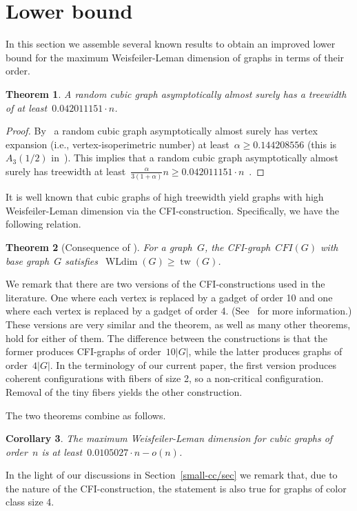 \documentclass[english,a4paper]{article}
\theoremstyle{plain}
\newtheorem{theorem}             {Theorem}[section]
\newtheorem{corollary}  [theorem]{Corollary}
\theoremstyle{definition}
\DeclareMathOperator*{\WLdim}{WLdim}
\newcommand{\wldim}[1]{\ensuremath{\WLdim\left(#1\right)}}
\DeclareMathOperator{\treewidth}{tw}
\begin{document}
\section{Lower bound}
\label{sec:lower:bound}


In this section we assemble several known results to obtain an improved lower bound for the maximum Weisfeiler-Leman dimension of graphs in terms of their order.


\begin{theorem}
    A random cubic graph asymptotically almost surely has a treewidth of at least~$ 0.042011151 \cdot n$.
\end{theorem}
\begin{proof}
    By~\cite{DBLP:journals/siamdm/KolesnikW14} a random cubic graph asymptotically almost surely has vertex expansion (i.e., vertex-isoperimetric number) at least~$\alpha\geq 0.144208556$ (this is~$A_3(1/2)$ in~\cite{DBLP:journals/siamdm/KolesnikW14}).
    This implies that a random cubic graph asymptotically almost surely has treewidth at least~$\frac{\alpha}{3(1+\alpha)} n\geq  0.042011151\cdot  n$~\cite[Corollary 7]{DBLP:journals/siamdm/DvorakN16}.
\end{proof}


It is well known that cubic graphs of high treewidth yield graphs with high Weisfeiler-Leman dimension via the CFI-construction.
Specifically, we have the following relation.


\begin{theorem}[Consequence of {\cite[Theorem 3]{DBLP:conf/csl/DawarR07}}]
    For a graph~$G$, the CFI-graph~$CFI(G)$ with base graph~$G$ satisfies~$\wldim{G}\geq \treewidth(G)$.
\end{theorem}


We remark that there are two versions of the CFI-constructions used in the literature. One where each vertex is replaced by a gadget of order 10 and one where each vertex is replaced by a gadget of order 4. (See~\cite{DBLP:conf/icalp/Furer01,DBLP:conf/esa/NeuenS17,tuprints24244} for more information.)
These versions are very similar and the theorem, as well as many other theorems, hold for either of them.
The difference between the constructions is that the former produces CFI-graphs of order~$10 |G|$, while the latter produces graphs of order~$4|G|$. In the terminology of our current paper, the first version produces coherent configurations with fibers of size 2, so a non-critical configuration. Removal of the tiny fibers yields the other construction.


The two theorems combine as follows.


\begin{corollary}
    The maximum Weisfeiler-Leman dimension for cubic graphs of order~$n$ is at least~$0.0105027 \cdot  n -o(n)$.
\end{corollary}


In the light of our discussions in Section~\ref{small-cc/sec} we remark that, due to the nature of the CFI-construction, the statement is also true for graphs of color class size 4.     
\end{document}
